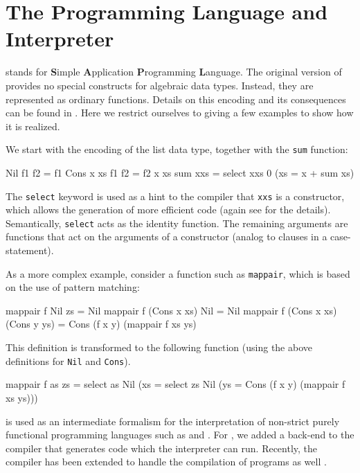 \section{The \Sapl Programming Language and Interpreter}
\label{sapljs:sec:sapl}
\Sapl stands for \textbf{S}imple \textbf{A}pplication \textbf{P}rogramming
\textbf{L}anguage. The original version of \Sapl provides no special constructs 
for algebraic data types. Instead, they are represented as ordinary functions.
Details on this encoding and its consequences can be found in \cite{JKP}.
Here we restrict ourselves to giving a few examples to show how it is realized.

We start with the encoding of the list data type, together with the \texttt{sum} function:
\begin{CleanCode}
Nil       f1  f2 = f1
Cons x xs f1  f2 = f2 x xs
sum          xxs = select xxs 0 (\x xs = x + sum xs)
\end{CleanCode}

The \texttt{select} keyword is used as a hint to the compiler that \texttt{xxs} 
is a constructor, which allows the generation of more efficient code (again see
\cite{JKP} for the details). Semantically, \texttt{select} acts as the identity
function. The remaining arguments are functions that act on the arguments of a
constructor (analog to clauses in a case-statement).

As a more complex example, consider a \Haskell function such as
\texttt{mappair}, which is based on the use of pattern matching:
  
\begin{CleanCode}
mappair f Nil          zs           = Nil 
mappair f (Cons x xs)  Nil          = Nil 
mappair f (Cons x xs)  (Cons y ys)  = Cons (f x y) (mappair f xs ys) 
\end{CleanCode}
This definition is transformed to the following \Sapl function (using the
above definitions for \texttt{Nil} and \texttt{Cons}).
\begin{CleanCode}
mappair f as zs 
= select as Nil (\x xs = select zs Nil (\y ys = Cons (f x y) (mappair f xs ys)))
\end{CleanCode}
%
\Sapl is used as an intermediate formalism for the interpretation of non-strict
purely functional programming languages such as \Haskell and \Clean. For \Clean,
we added a \Sapl back-end to the \Clean compiler that generates \Sapl code which
the interpreter can run. Recently, the \Clean compiler has been extended to
handle the compilation of \Haskell programs as well \cite{HASCLEAN}.

